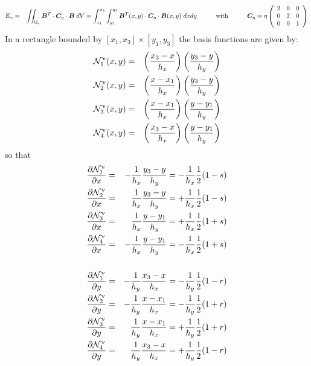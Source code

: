 \begin{eqnarray}
{\mathbb{K}}_e 
&=& \iint_{\Omega_e} {\bm B}^T \cdot {\bm C}_\eta \cdot {\bm B} \; dV 
= \int_{x_1}^{x_3}\int_{y_1}^{y_3} 
{\bm B}^T(x,y) \cdot {\bm C}_\eta \cdot {\bm B}(x,y) \; dx dy 
\quad \qquad\text{with}\qquad \quad
{\bm C}_\eta = \eta \left(\begin{array}{ccc}
2 &0 &0\\
0 &2 &0\\
0 &0 &1 
\end{array}\right) \nonumber
\end{eqnarray}
In a rectangle bounded by $[x_1,x_3]\times[y_1,y_3]$ the basis functions are given by:
\begin{eqnarray}
{{\mathcal{N}}}_1^\upnu(x,y) &=& \left( \frac{x_3 -x }{h_x}  \right) \left( \frac{y_3 -y }{h_y}  \right) \nonumber\\
{{\mathcal{N}}}_2^\upnu(x,y) &=& \left( \frac{x - x_1}{h_x}  \right) \left( \frac{y_3 -y }{h_y}  \right) \nonumber\\
{{\mathcal{N}}}_3^\upnu(x,y) &=& \left( \frac{x - x_1}{h_x}  \right) \left( \frac{y - y_1}{h_y}  \right) \nonumber\\
{{\mathcal{N}}}_4^\upnu(x,y) &=& \left( \frac{x_3 -x }{h_x}  \right) \left( \frac{y - y_1}{h_y}  \right) \nonumber 
\end{eqnarray}
so that 
\begin{eqnarray}
\frac{\partial {\mathcal{N}}_1^\upnu}{\partial x} &=&-\frac{1}{h_x}\frac{y_3-y}{h_y}=-\frac{1}{h_x}\frac12 (1-s)\nonumber\\
\frac{\partial {\mathcal{N}}_2^\upnu}{\partial x} &=& \frac{1}{h_x}\frac{y_3-y}{h_y}=+\frac{1}{h_x}\frac12 (1-s)\nonumber\\
\frac{\partial {\mathcal{N}}_3^\upnu}{\partial x} &=& \frac{1}{h_x}\frac{y-y_1}{h_y}=+\frac{1}{h_x}\frac12 (1+s)\nonumber\\
\frac{\partial {\mathcal{N}}_4^\upnu}{\partial x} &=&-\frac{1}{h_x}\frac{y-y_1}{h_y}=-\frac{1}{h_x}\frac12 (1+s)\nonumber\\
\nonumber\\
\frac{\partial {\mathcal{N}}_1^\upnu}{\partial y} &=&-\frac{1}{h_y}\frac{x_3-x}{h_x}=-\frac{1}{h_y}\frac12 (1-r)\nonumber\\
\frac{\partial {\mathcal{N}}_2^\upnu}{\partial y} &=&-\frac{1}{h_y}\frac{x-x_1}{h_x}=-\frac{1}{h_y}\frac12 (1+r)\nonumber\\
\frac{\partial {\mathcal{N}}_3^\upnu}{\partial y} &=& \frac{1}{h_y}\frac{x-x_1}{h_x}=+\frac{1}{h_y}\frac12 (1+r)\nonumber\\
\frac{\partial {\mathcal{N}}_4^\upnu}{\partial y} &=& \frac{1}{h_y}\frac{x_3-x}{h_x}=+\frac{1}{h_y}\frac12 (1-r)
\nonumber
\end{eqnarray}
